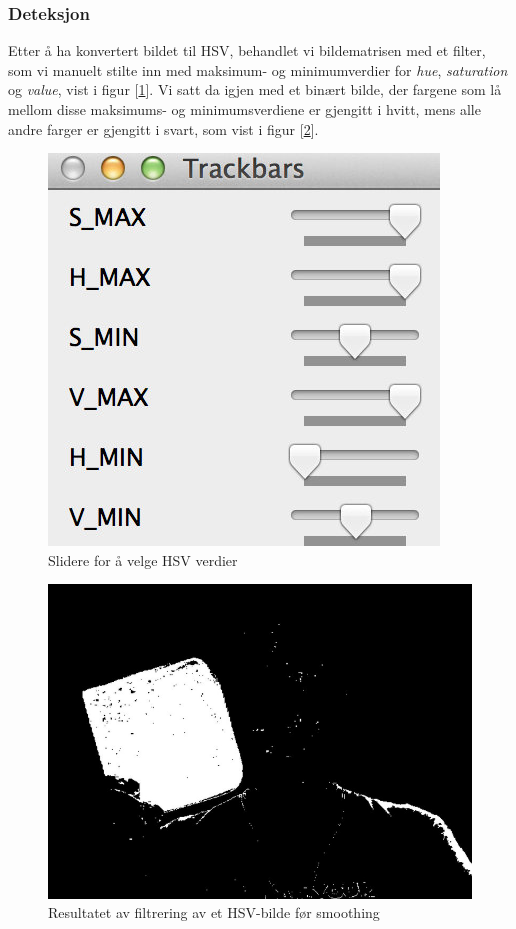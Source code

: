 \subsubsection{Deteksjon}

Etter å ha konvertert bildet til HSV, behandlet vi bildematrisen med et filter, som vi manuelt stilte inn med maksimum- og minimumverdier for \emph{hue}, \emph{saturation} og \emph{value}, vist i figur [\ref{fig:sliders}]. Vi satt da igjen med et binært bilde, der fargene som lå mellom disse maksimums- og minimumsverdiene er gjengitt i hvitt, mens alle andre farger er gjengitt i svart, som vist i figur [\ref{fig:firstiterationbinary}].

\begin{figure}[h!]
	\centering
	\includegraphics[scale=0.45]{img/sliders.jpg}
	\caption{Slidere for å velge HSV verdier}
	\label{fig:sliders}
\end{figure}

\begin{figure}[h!]
	\centering
	\includegraphics[scale=0.45]{img/first-binary.jpg}
	\caption{Resultatet av filtrering av et HSV-bilde før smoothing}
	\label{fig:firstiterationbinary}
\end{figure}

